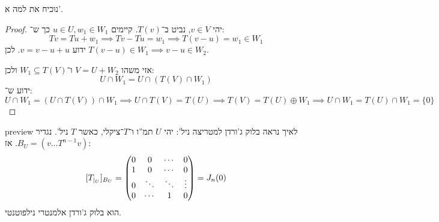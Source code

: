 \documentclass[]{../../../../tex/classes/styledArticle}
\begin{document}
    נוכיח את למה א'. \begin{proof}
        יהי $v \in V$, נביט ב־$T(v)$. קיימים $u \in U, w_1 \in W_1$ כך ש־: 
        \[ Tv = Tu + w_1 \implies Tv - Tu = w_1 \implies T(v - u) = w_1 \in W_1 \]
        ידוע $v = v - u + u$. לכן $T(v - u) \in W_1 \implies v - u \in W_2$. 
        
        אזי משהו $V = U + W_2$ ו־$W_1 \subseteq T(V)$ ולכן: 
        \[ U \cap W_1 = U \cap (T(V) \cap W_1) \]
        ידוע ש־: 
        \[ U \cap W_1 = (U \cap T(V)) \cap W_1 \implies U \cap T(V) = T(U) \implies T(V) = T(U) \oplus W_1 \implies U \cap W_1 = T(U) \cap W_1 = \{0\} \]
    \end{proof}
    
    preview לאיך נראה בלוק ג'ורדן למטריצה ניל': 
    יהי $U$ תמ''ו ו־$T$־ציקלי, כאשר $T$ ניל'. נגדיר $B_U = (v \dots T^{n - 1}v)$. אז:
    \[ [T_{|_{U}}]_{B_U} = \begin{pmatrix} 0 & 0 & \cdots & 0 \\ 1 & 0 & \cdots & 0\\ 0 & \ddots & \ddots & \vdots \\ 0 & \cdots & 1 & 0 \end{pmatrix} = J_n(0) \]
    הוא בלוק ג'ורדן אלמנטרי נילפוטנטי. 
    
    \ndoc
\end{document}

